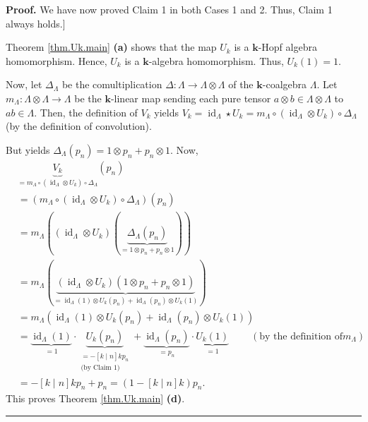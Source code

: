 \documentclass[numbers=enddot,12pt,final,onecolumn,notitlepage]{scrartcl}%
\theoremstyle{definition}
\newenvironment{proof}[1][Proof]{\noindent\textbf{#1.} }{\ \rule{0.5em}{0.5em}}
\begin{document}
\begin{proof}
We have now proved Claim 1 in both Cases 1 and 2. Thus, Claim 1 always holds.]

Theorem \ref{thm.Uk.main} \textbf{(a)} shows that the map $U_{k}$ is a
$\mathbf{k}$-Hopf algebra homomorphism. Hence, $U_{k}$ is a $\mathbf{k}%
$-algebra homomorphism. Thus, $U_{k}\left(  1\right)  =1$.

Now, let $\Delta_{\Lambda}$ be the comultiplication $\Delta:\Lambda
\rightarrow\Lambda\otimes\Lambda$ of the $\mathbf{k}$-coalgebra $\Lambda$. Let
$m_{\Lambda}:\Lambda\otimes\Lambda\rightarrow\Lambda$ be the $\mathbf{k}%
$-linear map sending each pure tensor $a\otimes b\in\Lambda\otimes\Lambda$ to
$ab\in\Lambda$. Then, the definition of $V_{k}$ yields $V_{k}%
=\operatorname*{id}\nolimits_{\Lambda}\star U_{k}=m_{\Lambda}\circ\left(
\operatorname*{id}\nolimits_{\Lambda}\otimes U_{k}\right)  \circ
\Delta_{\Lambda}$ (by the definition of convolution).

But \cite[Proposition 2.3.6(i)]{GriRei} yields $\Delta_{\Lambda}\left(
p_{n}\right)  =1\otimes p_{n}+p_{n}\otimes1$. Now,%
\begin{align*}
&  \underbrace{V_{k}}_{=m_{\Lambda}\circ\left(  \operatorname*{id}%
\nolimits_{\Lambda}\otimes U_{k}\right)  \circ\Delta_{\Lambda}}\left(
p_{n}\right) \\
&  =\left(  m_{\Lambda}\circ\left(  \operatorname*{id}\nolimits_{\Lambda
}\otimes U_{k}\right)  \circ\Delta_{\Lambda}\right)  \left(  p_{n}\right) \\
&  =m_{\Lambda}\left(  \left(  \operatorname*{id}\nolimits_{\Lambda}\otimes
U_{k}\right)  \left(  \underbrace{\Delta_{\Lambda}\left(  p_{n}\right)
}_{=1\otimes p_{n}+p_{n}\otimes1}\right)  \right) \\
&  =m_{\Lambda}\left(  \underbrace{\left(  \operatorname*{id}%
\nolimits_{\Lambda}\otimes U_{k}\right)  \left(  1\otimes p_{n}+p_{n}%
\otimes1\right)  }_{=\operatorname*{id}\nolimits_{\Lambda}\left(  1\right)
\otimes U_{k}\left(  p_{n}\right)  +\operatorname*{id}\nolimits_{\Lambda
}\left(  p_{n}\right)  \otimes U_{k}\left(  1\right)  }\right) \\
&  =m_{\Lambda}\left(  \operatorname*{id}\nolimits_{\Lambda}\left(  1\right)
\otimes U_{k}\left(  p_{n}\right)  +\operatorname*{id}\nolimits_{\Lambda
}\left(  p_{n}\right)  \otimes U_{k}\left(  1\right)  \right) \\
&  =\underbrace{\operatorname*{id}\nolimits_{\Lambda}\left(  1\right)  }%
_{=1}\cdot\underbrace{U_{k}\left(  p_{n}\right)  }_{\substack{=-\left[  k\mid
n\right]  kp_{n}\\\text{(by Claim 1)}}}+\underbrace{\operatorname*{id}%
\nolimits_{\Lambda}\left(  p_{n}\right)  }_{=p_{n}}\cdot\underbrace{U_{k}%
\left(  1\right)  }_{=1}\ \ \ \ \ \ \ \ \ \ \left(  \text{by the definition of
}m_{\Lambda}\right) \\
&  =-\left[  k\mid n\right]  kp_{n}+p_{n}=\left(  1-\left[  k\mid n\right]
k\right)  p_{n}.
\end{align*}
This proves Theorem \ref{thm.Uk.main} \textbf{(d)}.
\end{proof}
\end{document}
